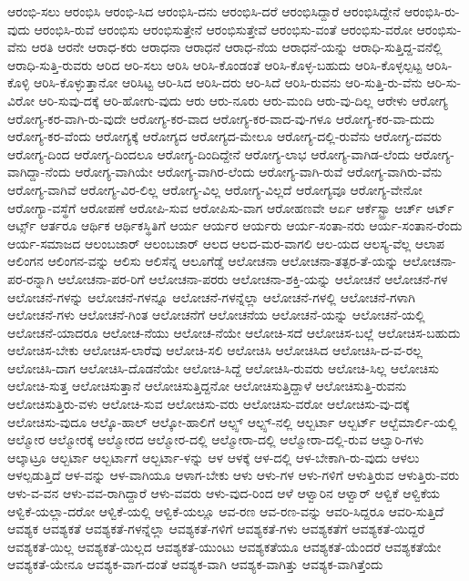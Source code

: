 {ಆರಂಭಿ-ಸಲು
ಆರಂಭಿಸಿ
ಆರಂಭಿ-ಸಿದ
ಆರಂಭಿಸಿ-ದನು
ಆರಂಭಿಸಿ-ದರೆ
ಆರಂಭಿಸಿದ್ದಾರೆ
ಆರಂಭಿಸಿದ್ದೇನೆ
ಆರಂಭಿಸಿ-ರು-ವುದು
ಆರಂಭಿಸಿ-ರುವೆ
ಆರಂಭಿಸು
ಆರಂಭಿಸುತ್ತೇನೆ
ಆರಂಭಿಸುತ್ತೇವೆ
ಆರಂಭಿಸು-ವಂತೆ
ಆರಂಭಿಸು-ವರೋ
ಆರಂಭಿಸು-ವೆನು
ಆರತಿ
ಆರನೇ
ಆರಾಧ-ಕರು
ಆರಾಧನಾ
ಆರಾಧನೆ
ಆರಾಧ-ನೆಯ
ಆರಾಧನೆ-ಯನ್ನು
ಆರಾಧಿ-ಸುತ್ತಿದ್ದ-ವನೆಲ್ಲಿ
ಆರಾಧಿ-ಸುತ್ತಿ-ರುವರು
ಆರಿದ
ಆರಿ-ಸಲು
ಆರಿಸಿ
ಆರಿಸಿ-ಕೊಂಡಂತೆ
ಆರಿಸಿ-ಕೊಳ್ಳ-ಬಹುದು
ಆರಿಸಿ-ಕೊಳ್ಳಲ್ಪಟ್ಟ
ಆರಿಸಿ-ಕೊಳ್ಳಿ
ಆರಿಸಿ-ಕೊಳ್ಳುತ್ತಾನೋ
ಆರಿಸಿಟ್ಟ
ಆರಿ-ಸಿದ
ಆರಿಸಿ-ದರು
ಆರಿ-ಸಿದೆ
ಆರಿಸಿ-ರುವನು
ಆರಿ-ಸುತ್ತಿ-ರು-ವೆನು
ಆರಿ-ಸು-ವಿರೋ
ಆರಿ-ಸುವು-ದಕ್ಕೆ
ಆರಿ-ಹೋಗು-ವುದು
ಆರು
ಆರು-ನೂರು
ಆರು-ಮಂದಿ
ಆರು-ವು-ದಿಲ್ಲ
ಆರೇಳು
ಆರೋಗ್ಯ
ಆರೋಗ್ಯ-ಕರ-ವಾಗಿ-ರು-ವುದೇ
ಆರೋಗ್ಯ-ಕರ-ವಾದ
ಆರೋಗ್ಯ-ಕರ-ವಾದ-ವು-ಗಳೂ
ಆರೋಗ್ಯ-ಕರ-ವಾ-ದುದು
ಆರೋಗ್ಯ-ಕರ-ವೆಂದು
ಆರೋಗ್ಯಕ್ಕೆ
ಆರೋಗ್ಯದ
ಆರೋಗ್ಯದ-ಮೇಲೂ
ಆರೋಗ್ಯ-ದಲ್ಲಿ-ರುವೆನು
ಆರೋಗ್ಯ-ದವರು
ಆರೋಗ್ಯ-ದಿಂದ
ಆರೋಗ್ಯ-ದಿಂದಲೂ
ಆರೋಗ್ಯ-ದಿಂದಿದ್ದೇನೆ
ಆರೋಗ್ಯ-ಲಾಭ
ಆರೋಗ್ಯ-ವಾಗಿಡ-ಲೆಂದು
ಆರೋಗ್ಯ-ವಾಗಿದ್ದಾ-ನೆಂದು
ಆರೋಗ್ಯ-ವಾಗಿಯೇ
ಆರೋಗ್ಯ-ವಾಗಿರ-ಲೆಂದು
ಆರೋಗ್ಯ-ವಾಗಿ-ರುವೆ
ಆರೋಗ್ಯ-ವಾಗಿರು-ವೆನು
ಆರೋಗ್ಯ-ವಾಗಿವೆ
ಆರೋಗ್ಯ-ವಿರ-ಲಿಲ್ಲ
ಆರೋಗ್ಯ-ವಿಲ್ಲ
ಆರೋಗ್ಯ-ವಿಲ್ಲದೆ
ಆರೋಗ್ಯವೂ
ಆರೋಗ್ಯ-ವೇನೋ
ಆರೋಗ್ಯಾ-ವಸ್ಥೆಗೆ
ಆರೋಪಣೆ
ಆರೋಪಿ-ಸುವ
ಆರೋಪಿಸು-ವಾಗ
ಆರೋಹಣವೇ
ಆರ್ಏ
ಆರ್ಕೆಸ್ಟ್ರಾ
ಆರ್ಚ್
ಆರ್ಟ್
ಆರ್ಟ್ಸ್
ಆರ್ತರೂ
ಆರ್ಥಿಕ
ಆರ್ಥಿಕಸ್ಥಿತಿಗೆ
ಆರ್ಯ
ಆರ್ಯರ
ಆರ್ಯರು
ಆರ್ಯ-ಸಂತಾ-ನರು
ಆರ್ಯ-ಸಂತಾನ-ರೆಂದು
ಆರ್ಯ-ಸಮಾಜದ
ಆಲಂಬಜಾರ್
ಆಲಂಬಜಾರ್
ಆಲದ
ಆಲದ-ಮರ-ವಾಗಲಿ
ಆಲ-ಯದ
ಆಲಸ್ಯ-ವೆಲ್ಲ
ಆಲಾಪ
ಆಲಿಂಗನ
ಆಲಿಂಗನ-ವನ್ನು
ಆಲಿಸು
ಆಲಿಸೆನ್ನ
ಆಲೂಗೆಡ್ಡೆ
ಆಲೋಚನಾ
ಆಲೋಚನಾ-ತತ್ಪರ-ತೆ-ಯನ್ನು
ಆಲೋಚನಾ-ಪರ-ರನ್ನಾಗಿ
ಆಲೋಚನಾ-ಪರ-ರಿಗೆ
ಆಲೋಚನಾ-ಪರರು
ಆಲೋಚನಾ-ಶಕ್ತಿ-ಯನ್ನು
ಆಲೋಚನೆ
ಆಲೋಚನೆ-ಗಳ
ಆಲೋಚನೆ-ಗಳನ್ನು
ಆಲೋಚನೆ-ಗಳನ್ನೂ
ಆಲೋಚನೆ-ಗಳನ್ನೆಲ್ಲಾ
ಆಲೋಚನೆ-ಗಳಲ್ಲಿ
ಆಲೋಚನೆ-ಗಳಾಗಿ
ಆಲೋಚನೆ-ಗಳು
ಆಲೋಚನೆ-ಗಿಂತ
ಆಲೋಚನೆಗೆ
ಆಲೋಚನೆಯ
ಆಲೋಚನೆ-ಯನ್ನು
ಆಲೋಚನೆ-ಯಲ್ಲಿ
ಆಲೋಚನೆ-ಯಾದರೂ
ಆಲೋಚ-ನೆಯು
ಆಲೋಚ-ನೆಯೇ
ಆಲೋಚಿ-ಸದೆ
ಆಲೋಚಿಸ-ಬಲ್ಲೆ
ಆಲೋಚಿಸ-ಬಹುದು
ಆಲೋಚಿಸ-ಬೇಕು
ಆಲೋಚಿಸ-ಲಾರೆವು
ಆಲೋಚಿ-ಸಲಿ
ಆಲೋಚಿಸಿ
ಆಲೋಚಿಸಿದ
ಆಲೋಚಿಸಿ-ದ-ವ-ರಲ್ಲ
ಆಲೋಚಿಸಿ-ದಾಗ
ಆಲೋಚಿಸಿ-ದೊಡನೆಯೇ
ಆಲೋಚಿ-ಸಿದ್ದೆ
ಆಲೋಚಿಸಿ-ರುವರು
ಆಲೋಚಿ-ಸಿಲ್ಲ
ಆಲೋಚಿಸು
ಆಲೋಚಿ-ಸುತ್ತ
ಆಲೋಚಿಸುತ್ತಾನೆ
ಆಲೋಚಿಸುತ್ತಿದ್ದನೋ
ಆಲೋಚಿಸುತ್ತಿದ್ದಾಳೆ
ಆಲೋಚಿಸುತ್ತಿ-ರುವನು
ಆಲೋಚಿಸುತ್ತಿರು-ವಳು
ಆಲೋಚಿ-ಸುವ
ಆಲೋಚಿಸು-ವರು
ಆಲೋಚಿಸು-ವರೋ
ಆಲೋಚಿಸು-ವು-ದಕ್ಕೆ
ಆಲೋಚಿಸು-ವುದೂ
ಆಲ್ಕೊ-ಹಾಲ್
ಆಲ್ಕೋ-ಹಾಲಿಗೆ
ಆಲ್ಪ್ಸ್
ಆಲ್ಪ್ಸ್-ನಲ್ಲಿ
ಆಲ್ಬರ್ಟಾ
ಆಲ್ಬರ್ಟ್
ಆಲ್ಬೆಮಾರ್ಲಿ-ಯಲ್ಲಿ
ಆಲ್ಮೋರ
ಆಲ್ಮೋರಕ್ಕೆ
ಆಲ್ಮೋರದ
ಆಲ್ಮೋರ-ದಲ್ಲಿ
ಆಲ್ಮೋರಾ-ದಲ್ಲಿ
ಆಲ್ಮೋರಾ-ದಲ್ಲಿ-ರುವ
ಆಲ್ವಾರಿ-ಗಳು
ಆಲ್ಕಾಟ್ರೂ
ಆಲ್ಬರ್ಟಾ
ಆಲ್ಬರ್ಟಾಗೆ
ಆಲ್ಬರ್ಟಾ-ಳನ್ನು
ಆಳ
ಆಳಕ್ಕೆ
ಆಳ-ದಲ್ಲಿ
ಆಳ-ಬೇಕಾಗಿ-ರು-ವುದು
ಆಳಲು
ಆಳಲ್ಪಡುತ್ತಿದೆ
ಆಳ-ವನ್ನು
ಆಳ-ವಾಗಿಯೂ
ಆಳಾಗ-ಬೇಕು
ಆಳು
ಆಳು-ಗಳ
ಆಳು-ಗಳಿಗೆ
ಆಳುತ್ತಿರುವ
ಆಳುತ್ತಿರು-ವರು
ಆಳು-ವ-ವನ
ಆಳು-ವವ-ರಾಗಿದ್ದಾರೆ
ಆಳು-ವವರು
ಆಳು-ವುದ-ರಿಂದ
ಆಳೆ
ಆಳ್ವಾರಿನ
ಆಳ್ವಾರ್
ಆಳ್ವಿಕೆ
ಆಳ್ವಿಕೆಯ
ಆಳ್ವಿಕೆ-ಯಲ್ಲಾ-ದರೋ
ಆಳ್ವಿಕೆ-ಯಲ್ಲಿ
ಆಳ್ವಿಕೆ-ಯಲ್ಲೂ
ಆವ-ರಣ
ಆವ-ರಣ-ವನ್ನು
ಆವರಿ-ಸಿದ್ದರೂ
ಆವರಿ-ಸುತ್ತಿದೆ
ಆವಶ್ಯಕ
ಆವಶ್ಯಕತೆ
ಆವಶ್ಯಕತೆ-ಗಳನ್ನೆಲ್ಲಾ
ಆವಶ್ಯಕತೆ-ಗಳಿಗೆ
ಆವಶ್ಯಕತೆ-ಗಳು
ಆವಶ್ಯಕತೆಗೆ
ಆವಶ್ಯಕತೆ-ಯಿದ್ದರೆ
ಆವಶ್ಯಕತೆ-ಯಿಲ್ಲ
ಆವಶ್ಯಕತೆ-ಯಿಲ್ಲದ
ಆವಶ್ಯಕತೆ-ಯುಂಟು
ಆವಶ್ಯಕತೆಯೂ
ಆವಶ್ಯಕತೆ-ಯೆಂದರೆ
ಆವಶ್ಯಕತೆಯೇ
ಆವಶ್ಯಕತೆ-ಯೇನೂ
ಆವಶ್ಯಕ-ವಾಗ-ದಂತೆ
ಆವಶ್ಯಕ-ವಾಗಿ
ಆವಶ್ಯಕ-ವಾಗಿತ್ತು
ಆವಶ್ಯಕ-ವಾಗಿತ್ತೆಂದು
}
